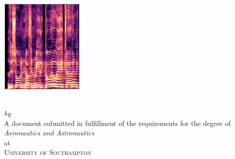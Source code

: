\begin{titlepage}
  \vspace*{2cm}
  \makeatletter
  \centering
  \includegraphics[width=0.3\textwidth]{frontmatter/TitleSpectrogram.png}
  \vspace*{2cm}
  \begin{center}
    \begin{Huge}
      \@title
    \end{Huge}\\[0.1cm]
    \vspace*{1cm}
    \emph{by}\\
    \@author \space {}
    \vfill
    A document submitted in fulfillment
    of the requirements for the degree of\\
    \emph{Aeronautics and Astronautics}\\
    at\\
    \textsc{University of Southampton}\\
  \end{center}
  \makeatother
\end{titlepage}

\newpage
\null
\thispagestyle{empty}
\newpage
